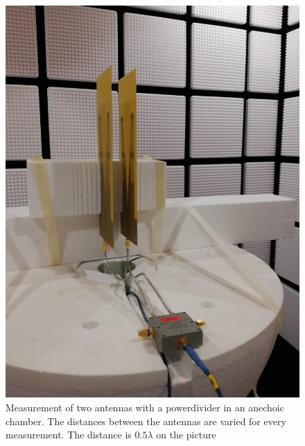 \begin{figure}[H]
\centering 
\includegraphics[scale = 0.05]{figures/measurement/antennas/two_ant.jpg}
\caption{Measurement of two antennas with a powerdivider in an anechoic chamber. The distances between the antennas are varied for every measurement. The distance is $0.5\lambda$ on the picture}
\label{fig:chamber_two_ant}
\end{figure} 


